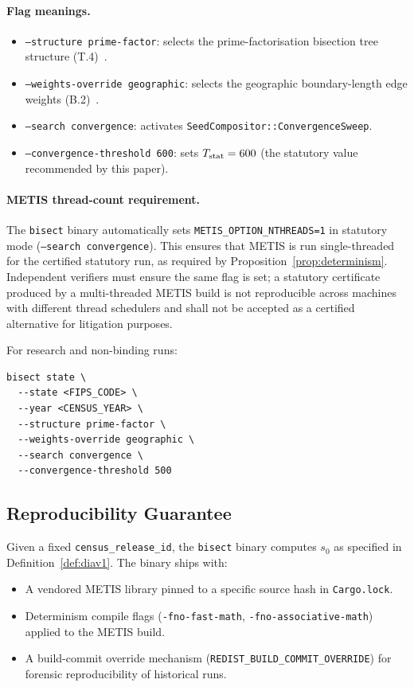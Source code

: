 \paragraph{Flag meanings.}
\begin{itemize}
\item \texttt{--structure prime-factor}: selects the \ar{} prime-factorisation
      bisection tree structure (T.4)~\citep{b11paper}.
\item \texttt{--weights-override geographic}: selects the geographic boundary-length
      edge weights (B.2)~\citep{b2paper}.
\item \texttt{--search convergence}: activates \texttt{SeedCompositor::ConvergenceSweep}.
\item \texttt{--convergence-threshold 600}: sets $T_{\mathrm{stat}} = 600$ (the statutory
      value recommended by this paper).
\end{itemize}

\paragraph{METIS thread-count requirement.}
The \texttt{bisect} binary automatically sets \texttt{METIS\_OPTION\_NTHREADS=1}
in statutory mode (\texttt{--search convergence}).
This ensures that METIS is run single-threaded for the certified statutory run,
as required by Proposition~\ref{prop:determinism}.
Independent verifiers must ensure the same flag is set; a statutory certificate
produced by a multi-threaded METIS build is not reproducible across machines
with different thread schedulers and shall not be accepted as a certified
alternative for litigation purposes.

For research and non-binding runs:

\begin{verbatim}
bisect state \
  --state <FIPS_CODE> \
  --year <CENSUS_YEAR> \
  --structure prime-factor \
  --weights-override geographic \
  --search convergence \
  --convergence-threshold 500
\end{verbatim}

\subsection{Reproducibility Guarantee}

Given a fixed \texttt{census\_release\_id}, the \texttt{bisect} binary
computes $s_0$ as specified in Definition~\ref{def:diav1}.
The binary ships with:
\begin{itemize}
\item A vendored METIS library pinned to a specific source hash in
      \texttt{Cargo.lock}.
\item Determinism compile flags (\texttt{-fno-fast-math},
      \texttt{-fno-associative-math}) applied to the METIS build.
\item A build-commit override mechanism (\texttt{REDIST\_BUILD\_COMMIT\_OVERRIDE})
      for forensic reproducibility of historical runs.
\end{itemize}

